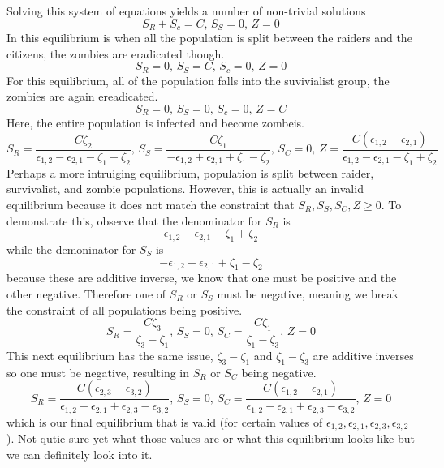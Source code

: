 \documentclass[12pt,a4paper]{exam}
\begin{document}
Solving this system of equations yields a number of non-trivial solutions
\[
    S_R + S_c = C,\, S_S = 0,\, Z = 0
\]
In this equilibrium is when all the population is split between the raiders and the citizens, the zombies are eradicated though.
\[
    S_R = 0,\, S_S = C,\, S_c = 0,\, Z = 0 
\]
For this equilibrium, all of the population falls into the suvivialist group, the zombies are again ereadicated.
\[
    S_R = 0,\, S_S = 0,\, S_c = 0,\, Z = C
\]
Here, the entire population is infected and become zombeis.
\[
    S_R = \frac{C \zeta_2}{\epsilon_{1,2} - \epsilon_{2,1} - \zeta_1 + \zeta_2},\,
    S_S = \frac{C \zeta_1}{-\epsilon_{1,2} + \epsilon_{2,1} + \zeta_1 - \zeta_2},\,
    S_C = 0,\,
    Z = \frac{C (\epsilon_{1,2} - \epsilon_{2,1})}{\epsilon_{1,2} - \epsilon_{2,1} - \zeta_1 + \zeta_2}
\]
Perhaps a more intruiging equilibrium, population is split between raider, survivalist, and zombie populations. However, this is actually an invalid equilibrium because it does not match the constraint that $S_R, S_S, S_C, Z \geq 0$. To demonstrate this, observe that the denominator for $S_R$ is
\[
    \epsilon_{1,2} - \epsilon_{2,1} - \zeta_1 + \zeta_2
\]
while the demoninator for $S_S$ is
\[
    -\epsilon_{1,2} + \epsilon_{2,1} + \zeta_1 - \zeta_2
\]
because these are additive inverse, we know that one must be positive and the other negative. Therefore one of $S_R$ or $S_S$ must be negative, meaning we break the constraint of all populations being positive.
\[
    S_R = \frac{C \zeta_3}{\zeta_3 - \zeta_1},\,
    S_S = 0,\,
    S_C = \frac{C \zeta_1}{\zeta_1 - \zeta_3},\,
    Z = 0
\]
This next equilibrium has the same issue, $\zeta_3 - \zeta_1$ and $\zeta_1 - \zeta_3$ are additive inverses so one must be negative, resulting in $S_R$ or $S_C$ being negative.
\[
    S_R = \frac{C (\epsilon_{2,3} - \epsilon_{3,2})}{\epsilon_{1,2} - \epsilon_{2,1} + \epsilon_{2,3} - \epsilon_{3,2}},\,
    S_S = 0,\,
    S_C = \frac{C (\epsilon_{1,2} - \epsilon_{2,1})}{\epsilon_{1,2} - \epsilon_{2,1} + \epsilon_{2,3} - \epsilon_{3,2}},\,
    Z = 0
\]
which is our final equilibrium that is valid (for certain values of $\epsilon_{1,2}, \epsilon_{2, 1}, \epsilon_{2, 3}, \epsilon_{3, 2}$). Not qutie sure yet what those values are or what this equilibrium looks like but we can definitely look into it.
\end{document}
